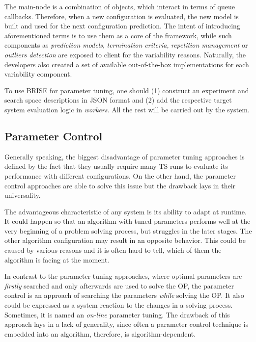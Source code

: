 The main-node is a combination of objects, which interact in terms of queue callbacks. Therefore, when a new configuration is evaluated, the new model is built and used for the next configuration prediction. The intent of introducing aforementioned terms is to use them as a core of the framework, while such components as \emph{prediction models}, \emph{termination criteria}, \emph{repetition management} or \emph{outliers detection} are exposed to client for the variability reasons. Naturally, the developers also created a set of available out-of-the-box implementations for each variability component.

To use BRISE for parameter tuning, one should (1) construct an experiment and search space descriptions in JSON format and (2) add the respective target system evaluation logic in \emph{workers}. All the rest will be carried out by the system.


\subsection{Parameter Control}\label{bg: parameter control}
Generally speaking, the biggest disadvantage of parameter tuning approaches is defined by the fact that they usually require many TS runs to evaluate its performance with different configurations. On the other hand, the parameter control approaches are able to solve this issue but the drawback lays in their universality.

The advantageous characteristic of any system is its ability to adapt at runtime.
It could happen so that an algorithm with tuned parameters performs well at the very beginning of a problem solving process, but struggles in the later stages. The other algorithm configuration may result in an opposite behavior. This could be caused by various reasons and it is often hard to tell, which of them the algorithm is facing at the moment. 

In contrast to the parameter tuning approaches, where optimal parameters are \emph{firstly} searched and only afterwards are used to solve the OP, the parameter control is an approach of searching the parameters \emph{while} solving the OP. It also could be expressed as a system reaction to the changes in a solving process. Sometimes, it is named an \emph{on-line} parameter tuning. The drawback of this approach lays in a lack of generality, since often a parameter control technique is embedded into an algorithm, therefore, is algorithm-dependent.

